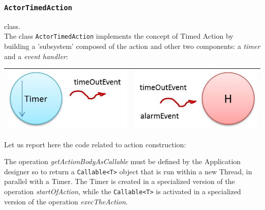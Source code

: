 \subsubsection{\texttt{ActorTimedAction}} class.\\
The class \texttt{ActorTimedAction} implements the concept of Timed Action by building a 'subsystem' composed of the action and other two components: a \textit{timer} and a \textit{event handler}:


\medskip 
\begin{center}
\medskip 
\begin{tabular}{|c|c|}
\hline 
\includegraphics[scale = 0.7]{img/actionTimer.jpg} & \includegraphics[scale = 0.5]{img/actionEventHandler.jpg} \\ 
\hline 
\end{tabular}
\end{center}

Let us report here the code related to action construction:



The operation \textit{getActionBodyAsCallable} must be defined by the Application designer so to return a \texttt{Callable<T>} object that is run within a new Thread, in parallel with a Timer. The Timer is created in a specialized version of the operation \textit{startOfAction}, while the  \texttt{Callable<T>} is activated in a specialized version of the operation \textit{execTheAction}.

